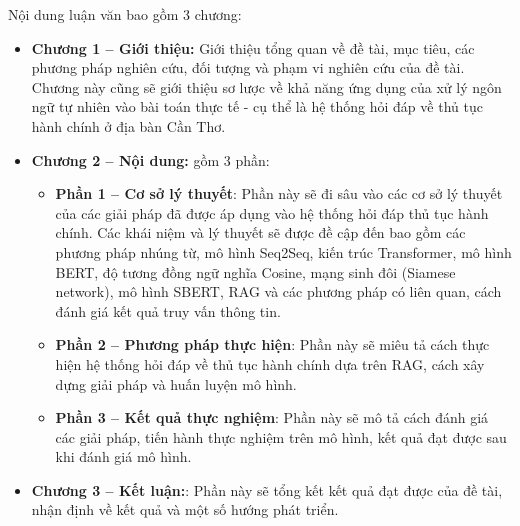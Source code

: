 Nội dung luận văn bao gồm 3 chương:


\begin{itemize}
    \item \textbf{Chương 1 -- Giới thiệu:} Giới thiệu tổng quan về đề tài, mục tiêu, các phương pháp nghiên cứu, đối tượng và phạm vi nghiên cứu của đề tài.
    Chương này cũng sẽ giới thiệu sơ lược về khả năng ứng dụng của xử lý ngôn ngữ tự nhiên vào bài toán thực tế - cụ thể là hệ thống hỏi đáp về thủ
    tục hành chính ở địa bàn Cần Thơ.
    \item \textbf{Chương 2 -- Nội dung:} gồm 3 phần:
          \begin{itemize}
              \item \textbf{Phần 1 -- Cơ sở lý thuyết}: Phần này sẽ đi sâu vào các cơ sở lý thuyết của các giải pháp đã được áp dụng vào hệ thống hỏi đáp thủ tục hành chính.
              Các khái niệm và lý thuyết sẽ được đề cập đến bao gồm các phương pháp nhúng từ, mô hình Seq2Seq, kiến trúc Transformer, mô hình BERT, 
              độ tương đồng ngữ nghĩa Cosine, mạng sinh đôi (Siamese network), mô hình SBERT, RAG và các phương pháp có liên quan, cách đánh giá kết quả truy vấn thông tin.
              \item \textbf{Phần 2 -- Phương pháp thực hiện}: Phần này sẽ miêu tả cách thực hiện hệ thống hỏi đáp về thủ tục hành chính dựa trên RAG, cách xây dựng giải pháp và huấn luyện mô hình.
              \item \textbf{Phần 3 -- Kết quả thực nghiệm}: Phần này sẽ mô tả cách đánh giá các giải pháp, tiến hành thực nghiệm trên mô hình, kết quả đạt được sau khi
              đánh giá mô hình. 
          \end{itemize}
    \item \textbf{Chương 3 -- Kết luận:}: Phần này sẽ tổng kết kết quả đạt được của đề tài, nhận định về kết quả và một số hướng phát triển.
\end{itemize}